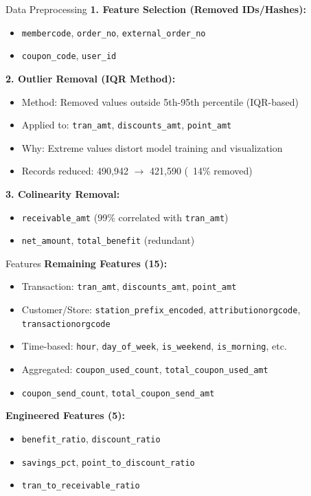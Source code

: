 \documentclass[aspectratio=169]{beamer}
\begin{document}
\begin{frame}[allowframebreaks]{Data Preprocessing}
\textbf{1. Feature Selection (Removed IDs/Hashes):}
\begin{itemize}
    \item \texttt{membercode}, \texttt{order\_no}, \texttt{external\_order\_no}
    \item \texttt{coupon\_code}, \texttt{user\_id}
\end{itemize}

\textbf{2. Outlier Removal (IQR Method):}
\begin{itemize}
    \item Method: Removed values outside 5th-95th percentile (IQR-based)
    \item Applied to: \texttt{tran\_amt}, \texttt{discounts\_amt}, \texttt{point\_amt}
    \item Why: Extreme values distort model training and visualization
    \item Records reduced: 490,942 $\rightarrow$ 421,590 (~14\% removed)
\end{itemize}

\textbf{3. Colinearity Removal:}
\begin{itemize}
    \item \texttt{receivable\_amt} (99\% correlated with \texttt{tran\_amt})
    \item \texttt{net\_amount}, \texttt{total\_benefit} (redundant)
\end{itemize}
\end{frame}

\begin{frame}[allowframebreaks]{Features}
\textbf{Remaining Features (15):}
\begin{itemize}
    \item Transaction: \texttt{tran\_amt}, \texttt{discounts\_amt}, \texttt{point\_amt}
    \item Customer/Store: \texttt{station\_prefix\_encoded}, \texttt{attributionorgcode}, \texttt{transactionorgcode}
    \item Time-based: \texttt{hour}, \texttt{day\_of\_week}, \texttt{is\_weekend}, \texttt{is\_morning}, etc.
    \item Aggregated: \texttt{coupon\_used\_count}, \texttt{total\_coupon\_used\_amt}
    \item \texttt{coupon\_send\_count}, \texttt{total\_coupon\_send\_amt}
\end{itemize}

\textbf{Engineered Features (5):}
\begin{itemize}
    \item \texttt{benefit\_ratio}, \texttt{discount\_ratio}
    \item \texttt{savings\_pct}, \texttt{point\_to\_discount\_ratio}
    \item \texttt{tran\_to\_receivable\_ratio}
\end{itemize}
\end{frame}
\end{document}
